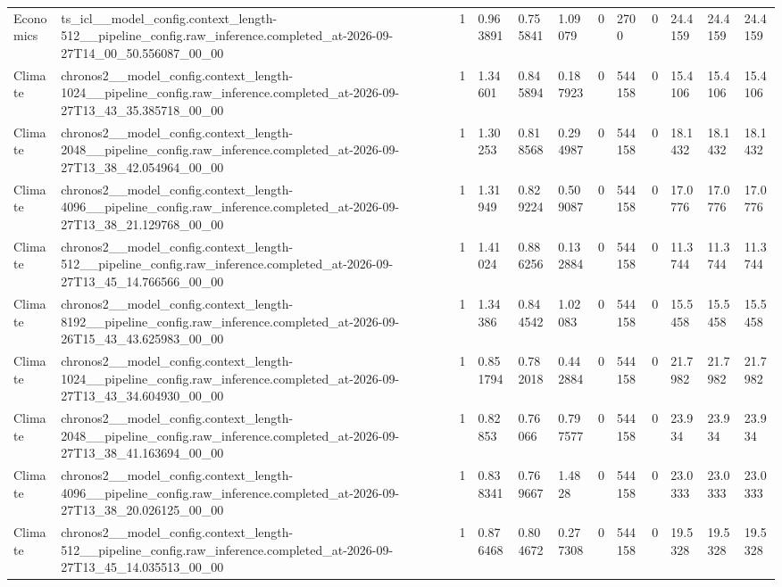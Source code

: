 \begin{tabular}{llllllllllll}
Economics & ts\_icl\_\_model\_config.context\_length-512\_\_pipeline\_config.raw\_inference.completed\_at-2026-09-27T14\_00\_50.556087\_00\_00 & 1 & 0.963891 & 0.755841 & 1.09079 & 0 & 2700 & 0 & 24.4159 & 24.4159 & 24.4159 \\
Climate & chronos2\_\_model\_config.context\_length-1024\_\_pipeline\_config.raw\_inference.completed\_at-2026-09-27T13\_43\_35.385718\_00\_00 & 1 & 1.34601 & 0.845894 & 0.187923 & 0 & 544158 & 0 & 15.4106 & 15.4106 & 15.4106 \\
Climate & chronos2\_\_model\_config.context\_length-2048\_\_pipeline\_config.raw\_inference.completed\_at-2026-09-27T13\_38\_42.054964\_00\_00 & 1 & 1.30253 & 0.818568 & 0.294987 & 0 & 544158 & 0 & 18.1432 & 18.1432 & 18.1432 \\
Climate & chronos2\_\_model\_config.context\_length-4096\_\_pipeline\_config.raw\_inference.completed\_at-2026-09-27T13\_38\_21.129768\_00\_00 & 1 & 1.31949 & 0.829224 & 0.509087 & 0 & 544158 & 0 & 17.0776 & 17.0776 & 17.0776 \\
Climate & chronos2\_\_model\_config.context\_length-512\_\_pipeline\_config.raw\_inference.completed\_at-2026-09-27T13\_45\_14.766566\_00\_00 & 1 & 1.41024 & 0.886256 & 0.132884 & 0 & 544158 & 0 & 11.3744 & 11.3744 & 11.3744 \\
Climate & chronos2\_\_model\_config.context\_length-8192\_\_pipeline\_config.raw\_inference.completed\_at-2026-09-26T15\_43\_43.625983\_00\_00 & 1 & 1.34386 & 0.844542 & 1.02083 & 0 & 544158 & 0 & 15.5458 & 15.5458 & 15.5458 \\
Climate & chronos2\_\_model\_config.context\_length-1024\_\_pipeline\_config.raw\_inference.completed\_at-2026-09-27T13\_43\_34.604930\_00\_00 & 1 & 0.851794 & 0.782018 & 0.442884 & 0 & 544158 & 0 & 21.7982 & 21.7982 & 21.7982 \\
Climate & chronos2\_\_model\_config.context\_length-2048\_\_pipeline\_config.raw\_inference.completed\_at-2026-09-27T13\_38\_41.163694\_00\_00 & 1 & 0.82853 & 0.76066 & 0.797577 & 0 & 544158 & 0 & 23.934 & 23.934 & 23.934 \\
Climate & chronos2\_\_model\_config.context\_length-4096\_\_pipeline\_config.raw\_inference.completed\_at-2026-09-27T13\_38\_20.026125\_00\_00 & 1 & 0.838341 & 0.769667 & 1.4828 & 0 & 544158 & 0 & 23.0333 & 23.0333 & 23.0333 \\
Climate & chronos2\_\_model\_config.context\_length-512\_\_pipeline\_config.raw\_inference.completed\_at-2026-09-27T13\_45\_14.035513\_00\_00 & 1 & 0.876468 & 0.804672 & 0.277308 & 0 & 544158 & 0 & 19.5328 & 19.5328 & 19.5328 \\

\end{tabular}
